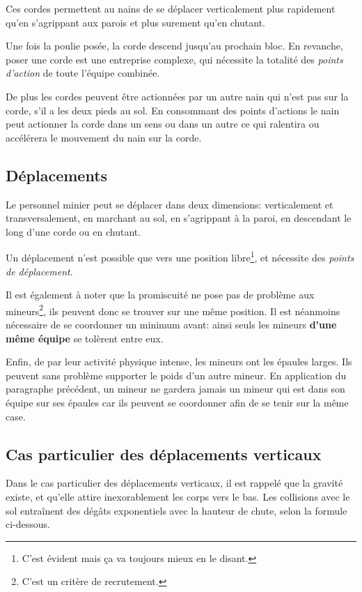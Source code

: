   Ces cordes permettent au nains de se déplacer verticalement plus rapidement
  qu'en s'agrippant aux parois et plus surement qu'en chutant.

  Une fois la poulie posée, la corde descend jusqu'au prochain bloc. En
  revanche, poser une corde est une entreprise complexe, qui nécessite la
  totalité des \textit{points d'action} de toute l'équipe combinée.

  De plus les cordes peuvent être actionnées par un autre nain qui n'est pas
  sur la corde, s'il a les deux pieds au sol. En consommant des points
  d'actions le nain peut actionner la corde dans un sens ou dans un autre ce
  qui ralentira ou accélérera le mouvement du nain sur la corde.

\subsection{Déplacements}

  Le personnel minier peut se déplacer dans deux dimensions: verticalement et
  transversalement, en marchant au sol, en s'agrippant à la paroi, en
  descendant le long d'une corde ou en chutant.

  Un déplacement n'est possible que vers une position libre\footnote{C'est
  évident mais ça va toujours mieux en le disant.}, et nécessite des
  \textit{points de déplacement}.

  Il est également à noter que la promiscuité ne pose pas de problème aux
  mineurs\footnote{C'est un critère de recrutement.}, ils peuvent donc se
  trouver sur une même position. Il est néanmoins nécessaire de se coordonner
  un minimum avant: ainsi seuls les mineurs \textbf{d'une même équipe} se
  tolèrent entre eux.

  Enfin, de par leur activité physique intense, les mineurs ont les épaules
  larges. Ils peuvent sans problème supporter le poids d'un autre mineur. En
  application du paragraphe précédent, un mineur ne gardera jamais un mineur
  qui est dans son équipe sur ses épaules car ils peuvent se coordonner afin de
  se tenir sur la même case.

\subsection{Cas particulier des déplacements verticaux}

  Dans le cas particulier des déplacements verticaux, il est rappelé que la
  gravité existe, et qu'elle attire inexorablement les corps vers le bas. Les
  collisions avec le sol entraînent des dégâts exponentiels avec la hauteur de
  chute, selon la formule ci-dessous.

